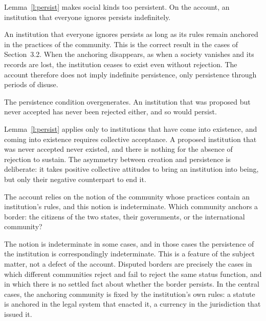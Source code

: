 \documentclass{situationist-preprint}
\begin{document}
\begin{objection}
Lemma~\ref{l:persist} makes social kinds too persistent. On the account, an institution that everyone ignores persists indefinitely.
\end{objection}

\begin{reply}
An institution that everyone ignores persists as long as its rules remain anchored in the practices of the community. This is the correct result in the cases of Section~3.2. When the anchoring disappears, as when a society vanishes and its records are lost, the institution ceases to exist even without rejection. The account therefore does not imply indefinite persistence, only persistence through periods of disuse.
\end{reply}

\begin{objection}
The persistence condition overgenerates. An institution that was proposed but never accepted has never been rejected either, and so would persist.
\end{objection}

\begin{reply}
Lemma~\ref{l:persist} applies only to institutions that have come into existence, and coming into existence requires collective acceptance. A proposed institution that was never accepted never existed, and there is nothing for the absence of rejection to sustain. The asymmetry between creation and persistence is deliberate: it takes positive collective attitudes to bring an institution into being, but only their negative counterpart to end it.
\end{reply}

\begin{objection}
The account relies on the notion of the community whose practices contain an institution's rules, and this notion is indeterminate. Which community anchors a border: the citizens of the two states, their governments, or the international community?
\end{objection}

\begin{reply}
The notion is indeterminate in some cases, and in those cases the persistence of the institution is correspondingly indeterminate. This is a feature of the subject matter, not a defect of the account. Disputed borders are precisely the cases in which different communities reject and fail to reject the same status function, and in which there is no settled fact about whether the border persists. In the central cases, the anchoring community is fixed by the institution's own rules: a statute is anchored in the legal system that enacted it, a currency in the jurisdiction that issued it.
\end{reply}
\end{document}
